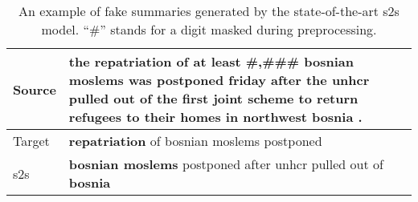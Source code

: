 \documentclass[letterpaper]{article} \usepackage{aaai18}  \usepackage{times}  \usepackage{helvet}  \usepackage{courier}  \usepackage{url}  \usepackage{graphicx}  \usepackage{amsfonts}
\begin{document}
	\begin{table}
		\centering
		\begin{tabularx}{\linewidth}{p{1cm}|X}
			\hline
			Source & the repatriation of at least \#,\#\#\# bosnian moslems was postponed friday after the unhcr pulled out of the first joint scheme to return refugees to their homes in northwest bosnia . \\ \hline
			Target & \textbf{repatriation} of bosnian moslems postponed                                                                                       \\ \hline
			s2s & \textbf{bosnian moslems} postponed after unhcr pulled out of \textbf{bosnia}                                                                                  \\ \hline
		\end{tabularx}
		\caption{An example of fake summaries generated by the state-of-the-art s2s model. ``\#'' stands for a digit masked during preprocessing.}
		\label{tb:invalid_example}
	\end{table}
	
\end{document}
